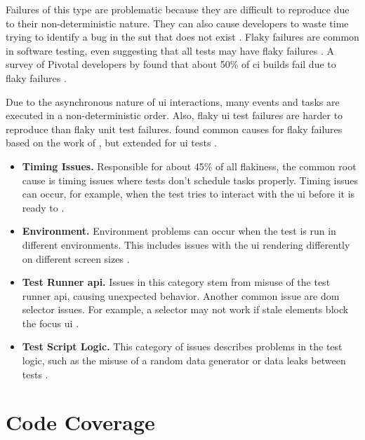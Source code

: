 Failures of this type are problematic because they are difficult to reproduce due to their non-deterministic nature.
They can also cause developers to waste time trying to identify a bug in the \ac{sut} that does not exist \autocite{ziftci_-flake_2020}.
Flaky failures are common in software testing, \citeauthor*{harman_start-ups_2018} even suggesting that all tests may have flaky failures \autocite{harman_start-ups_2018}.
A survey of Pivotal developers by \citeauthor*{hilton_trade-offs_2017} found that about 50\% of \ac{ci} builds fail due to flaky failures \autocite{hilton_trade-offs_2017}.

Due to the asynchronous nature of \ac{ui} interactions, many events and tasks are executed in a non-deterministic order.
Also, flaky \ac{ui} test failures are harder to reproduce than flaky unit test failures.
 found common causes for flaky failures based on the work of \citeauthor*{luo_empirical_2014}, but extended for \ac{ui} tests \autocite{luo_empirical_2014,romano_empirical_2021}.

\begin{itemize}
	\item \textbf{Timing Issues.} Responsible for about 45\% of all flakiness, the common root cause is timing issues where tests don't schedule tasks properly.
	      Timing issues can occur, for example, when the test tries to interact with the \ac{ui} before it is ready to \autocite{romano_empirical_2021}.
	\item \textbf{Environment.} Environment problems can occur when the test is run in different environments.
	      This includes issues with the \ac{ui} rendering differently on different screen sizes \autocite{romano_empirical_2021}.
	\item \textbf{Test Runner \acs{api}.} Issues in this category stem from misuse of the test runner \ac{api}, causing unexpected behavior.
	      Another common issue are \ac{dom} selector issues. For example, a selector may not work if stale elements block the focus \ac{ui} \autocite{romano_empirical_2021}.
	\item \textbf{Test Script Logic.} This category of issues describes problems in the test logic, such as the misuse of a random data generator or data leaks between tests \autocite{romano_empirical_2021}.
\end{itemize}


\section{Code Coverage}


